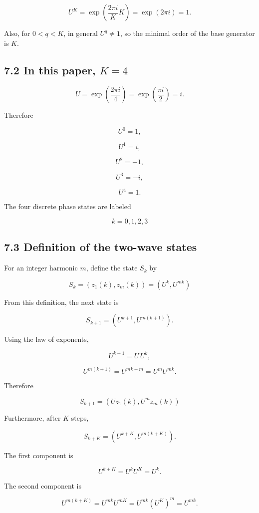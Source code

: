\documentclass[
  a4paper,
]{article}
\begin{document}
\[
U^K
=
\exp\left(\frac{2\pi i}{K}K\right)
=
\exp(2\pi i)
=
1.
\]

Also, for \(0<q<K\), in general \(U^q\ne1\), so the minimal order of the
base generator is \(K\).

\subsection{\texorpdfstring{7.2 In this paper,
\(K=4\)}{7.2 In this paper, K=4}}\label{in-this-paper-k4}

\[
U
=
\exp\left(\frac{2\pi i}{4}\right)
=
\exp\left(\frac{\pi i}{2}\right)
=i.
\]

Therefore

\[
U^0=1,
\]

\[
U^1=i,
\]

\[
U^2=-1,
\]

\[
U^3=-i,
\]

\[
U^4=1.
\]

The four discrete phase states are labeled

\[
k=0,1,2,3
\]

\subsection{7.3 Definition of the two-wave
states}\label{definition-of-the-two-wave-states}

For an integer harmonic \(m\), define the state \(S_k\) by

\[
\boxed{
S_k
=
\left(z_1(k),z_m(k)\right)
=
\left(U^k,U^{mk}\right)
}
\]

From this definition, the next state is

\[
S_{k+1}
=
\left(U^{k+1},U^{m(k+1)}\right).
\]

Using the law of exponents,

\[
U^{k+1}
=
U\,U^k,
\]

\[
U^{m(k+1)}
=
U^{mk+m}
=
U^m U^{mk}.
\]

Therefore

\[
\boxed{
S_{k+1}
=
\left(U z_1(k),U^m z_m(k)\right)
}
\]

Furthermore, after \(K\) steps,

\[
S_{k+K}
=
\left(U^{k+K},U^{m(k+K)}\right).
\]

The first component is

\[
U^{k+K}
=
U^k U^K
=
U^k.
\]

The second component is

\[
U^{m(k+K)}
=
U^{mk}U^{mK}
=
U^{mk}(U^K)^m
=
U^{mk}.
\]
\end{document}
